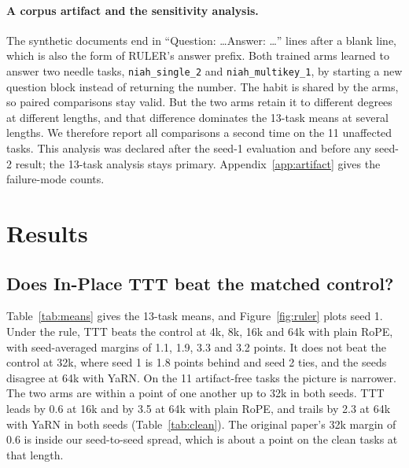 \documentclass{article}
\begin{document}
\paragraph{A corpus artifact and the sensitivity analysis.} The synthetic documents end in ``Question: \dots Answer: \dots'' lines after a blank line, which is also the form of RULER's answer prefix. Both trained arms learned to answer two needle tasks, \texttt{niah\_single\_2} and \texttt{niah\_multikey\_1}, by starting a new question block instead of returning the number. The habit is shared by the arms, so paired comparisons stay valid. But the two arms retain it to different degrees at different lengths, and that difference dominates the 13-task means at several lengths. We therefore report all comparisons a second time on the 11 unaffected tasks. This analysis was declared after the seed-1 evaluation and before any seed-2 result; the 13-task analysis stays primary. Appendix~\ref{app:artifact} gives the failure-mode counts.

\section{Results}

\subsection{Does In-Place TTT beat the matched control?}

Table~\ref{tab:means} gives the 13-task means, and Figure~\ref{fig:ruler} plots seed 1. Under the rule, TTT beats the control at 4k, 8k, 16k and 64k with plain RoPE, with seed-averaged margins of 1.1, 1.9, 3.3 and 3.2 points. It does not beat the control at 32k, where seed 1 is 1.8 points behind and seed 2 ties, and the seeds disagree at 64k with YaRN. On the 11 artifact-free tasks the picture is narrower. The two arms are within a point of one another up to 32k in both seeds. TTT leads by 0.6 at 16k and by 3.5 at 64k with plain RoPE, and trails by 2.3 at 64k with YaRN in both seeds (Table~\ref{tab:clean}). The original paper's 32k margin of 0.6 is inside our seed-to-seed spread, which is about a point on the clean tasks at that length.
\end{document}
